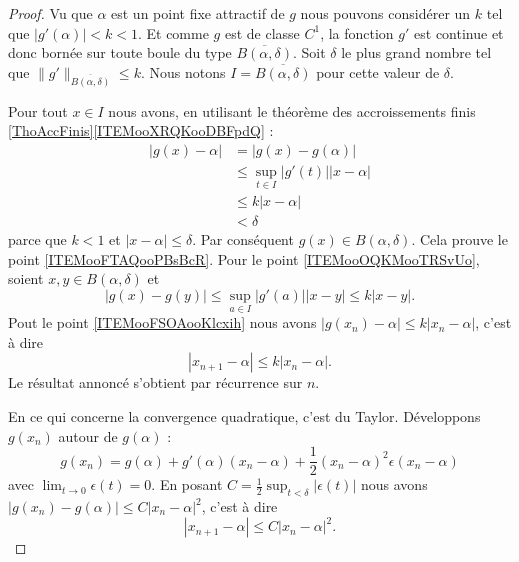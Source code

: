 \begin{proof}
    Vu que \( \alpha\) est un point fixe attractif de \( g\) nous pouvons considérer un \( k\) tel que \( | g'(\alpha) |<k<1\). Et comme \( g\) est de classe \( C^1\), la fonction \( g'\) est continue et donc bornée sur toute boule du type \( \overline{ B(\alpha,\delta) }\). Soit \( \delta\) le plus grand nombre tel que \( \| g' \|_{\overline{ B(\alpha,\delta) }}\leq k\). Nous notons \( I=\overline{ B(\alpha,\delta) } \) pour cette valeur de \( \delta\).

    Pour tout \( x\in I\) nous avons, en utilisant le théorème des accroissements finis \ref{ThoAccFinis}\ref{ITEMooXRQKooDBFpdQ} :
    \begin{subequations}        \label{SUBEQooYXLHooSCnnRA}
        \begin{align}
            | g(x)-\alpha |&=| g(x)-g(\alpha) |\\
            &\leq\sup_{t\in I}| g'(t) | |x-\alpha |\\
            &\leq k| x-\alpha |\\
            &<\delta
        \end{align}
    \end{subequations}
    parce que \( k<1\) et \(| x-\alpha |\leq \delta\). Par conséquent \( g(x)\in B(\alpha,\delta)\). Cela prouve le point \ref{ITEMooFTAQooPBsBcR}. Pour le point \ref{ITEMooOQKMooTRSvUo}, soient \( x,y\in B(\alpha,\delta)\) et
    \begin{equation}
        | g(x)-g(y) |\leq \sup_{a\in I}| g'(a) | |x-y |\leq k| x-y |.
    \end{equation}
    Pout le point \ref{ITEMooFSOAooKlcxih} nous avons \( | g(x_n)-\alpha |\leq k| x_n-\alpha |\), c'est à dire
    \begin{equation}
        | x_{n+1}-\alpha |\leq k| x_n-\alpha |.
    \end{equation}
    Le résultat annoncé s'obtient par récurrence sur \( n\).

    En ce qui concerne la convergence quadratique, c'est du Taylor. Développons \( g(x_n)\) autour de \( g(\alpha)\) :
    \begin{equation}
        g(x_n)=g(\alpha)+g'(\alpha)(x_n-\alpha)+\frac{ 1 }{2}(x_n-\alpha)^2\epsilon(x_n-\alpha)
    \end{equation}
    avec \( \lim_{t\to 0} \epsilon(t)=0\). En posant \( C=\frac{ 1 }{2}\sup_{t<\delta}| \epsilon(t) | \) nous avons $| g(x_n)-g(\alpha) |\leq C|x_n-\alpha  |^2$, c'est à dire
    \begin{equation}
        | x_{n+1}-\alpha |\leq C| x_n-\alpha |^2.
    \end{equation}
\end{proof}

